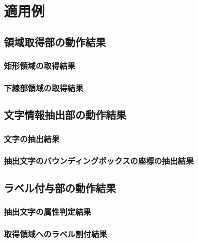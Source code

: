 \chapter{適用例}\label{cha:Indication}




\section{領域取得部の動作結果}\label{sec:result_area_detection}

\subsection{矩形領域の取得結果}\label{subsec:result_rect_area}

\subsection{下線部領域の取得結果}\label{subsec:result_underline_area}


\section{文字情報抽出部の動作結果}\label{sec:result_OCR}

\subsection{文字の抽出結果}\label{subsec:result_OCR_char}

\subsection{抽出文字のバウンディングボックスの座標の抽出結果}\label{subsec:result_OCR_bbox}


\section{ラベル付与部の動作結果}\label{sec:result_area_labeling}

\subsection{抽出文字の属性判定結果}\label{subsec:result_att_prediction}

\subsection{取得領域へのラベル割付結果}\label{subsec:result_label_link}